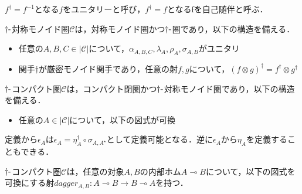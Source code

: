 \documentclass[type_judgement.tex]{subfiles}
\begin{document}
$f^\dagger=f^{-1}$となる$f$をユニタリーと呼び，$f^\dagger=f$となるfを自己随伴と呼ぶ．

\begin{defn}
$\dagger\mathchar`-$対称モノイド圏$\mathcal{C}$は，対称モノイド圏かつ$\dagger\mathchar`-$圏であり，以下の構造を備える．
\begin{itemize}
    \item 任意の$A,B,C\in|\mathcal{C}|$について，$\alpha_{A,B,C},\lambda_{A},\rho_{A},\sigma_{A,B}$がユニタリ
    \item 関手$\dagger$が厳密モノイド関手であり，任意の射$f,g$について，$(f\otimes g)^\dagger = f^\dagger \otimes g^\dagger$
\end{itemize}
\end{defn}

\begin{defn}
$\dagger\mathchar`-$コンパクト圏$\mathcal{C}$は，コンパクト閉圏かつ$\dagger\mathchar`-$対称モノイド圏であり，以下の構造を備える．
\begin{itemize}
    \item 任意の$A\in|\mathcal{C}|$について，以下の図式が可換\\
    \begin{center}
    \end{center}
\end{itemize}
\end{defn}
定義から$\epsilon_A$は$\epsilon_A=\eta_A^\dagger\circ\sigma_{A,A^\star}$として定義可能となる．逆に$\epsilon_A$から$\eta_A$を定義することもできる．

$\dagger\mathchar`-$コンパクト圏$\mathcal{C}$は，任意の対象$A,B$の内部ホム$A \multimap B$について，以下の図式を可換にする射$dagger_{A,B}:A \multimap B \rightarrow B \multimap A$を持つ．
\begin{center}
\end{center}
\end{document}
